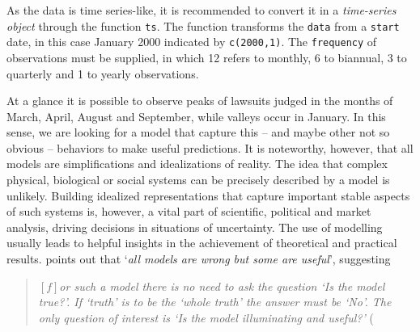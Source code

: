 \documentclass[a4paper]{exam}
\theoremstyle{plain}
\begin{document}
As the data is time series-like, it is recommended to convert it in a \textit{time-series object} through the function \texttt{ts}. The function transforms the \texttt{data} from a \texttt{start} date, in this case January 2000 indicated by \texttt{c(2000,1)}. The \texttt{frequency} of observations must be supplied, in which 12 refers to monthly, 6 to biannual, 3 to quarterly and 1 to yearly observations. %

At a glance it is possible to observe peaks of lawsuits judged in the months of March, April, August and September, while valleys occur in January. In this sense, we are looking for a model that capture this -- and maybe other not so obvious -- behaviors to make useful predictions. It is noteworthy, however, that all models are simplifications and idealizations of reality. The idea that complex physical, biological or social systems can be precisely described by a model is unlikely. Building idealized representations that capture important stable aspects of such systems is, however, a vital part of scientific, political and market analysis, driving decisions in situations of uncertainty. The use of modelling usually leads to helpful insights in the achievement of theoretical and practical results. \cite{box1979robustness} points out that `\textit{all models are wrong but some are useful}', suggesting
\begin{quote}
\textit{$\left[f\right]$or such a model there is no need to ask the question `Is the model true?'. If `truth' is to be the `whole truth' the answer must be `No'. The only question of interest is `Is the model illuminating and useful?'} (\cite[pp. 202-203]{box1979robustness}
\end{quote}
\end{document}
